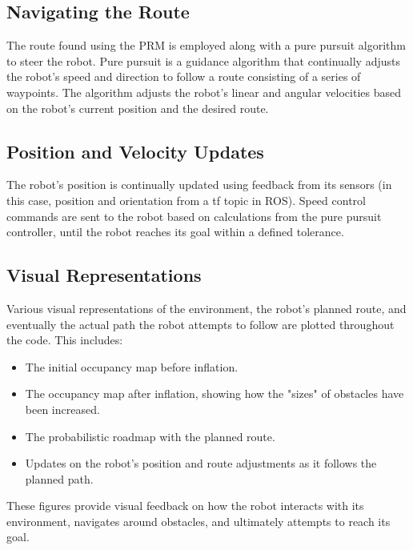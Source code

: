 \documentclass[12pt,a4paper]{article}
\begin{document}
	\subsection{Navigating the Route}
	The route found using the PRM is employed along with a pure pursuit algorithm to steer the robot. Pure pursuit is a guidance algorithm that continually adjusts the robot's speed and direction to follow a route consisting of a series of waypoints. The algorithm adjusts the robot's linear and angular velocities based on the robot's current position and the desired route.
	
	\subsection{Position and Velocity Updates}
	The robot's position is continually updated using feedback from its sensors (in this case, position and orientation from a tf topic in ROS). Speed control commands are sent to the robot based on calculations from the pure pursuit controller, until the robot reaches its goal within a defined tolerance.
	
	\subsection{Visual Representations}
	Various visual representations of the environment, the robot's planned route, and eventually the actual path the robot attempts to follow are plotted throughout the code. This includes:
	\begin{itemize}
		\item The initial occupancy map before inflation.
		\item The occupancy map after inflation, showing how the "sizes" of obstacles have been increased.
		\item The probabilistic roadmap with the planned route.
		\item Updates on the robot's position and route adjustments as it follows the planned path.
	\end{itemize}
	These figures provide visual feedback on how the robot interacts with its environment, navigates around obstacles, and ultimately attempts to reach its goal.
	
\end{document}
